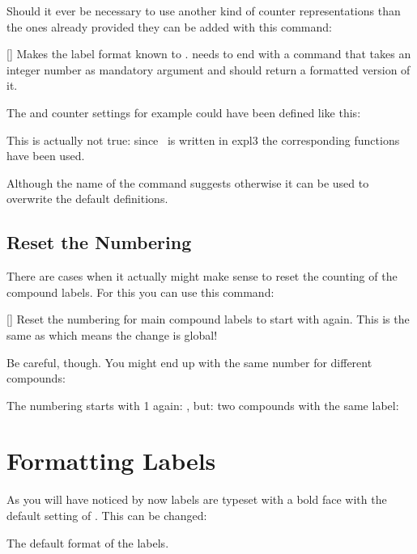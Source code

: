 \documentclass[load-preamble+,babel-options={ngerman,british,american}]{cnltx-doc}
\begin{document}
Should it ever be necessary to use another kind of counter representations
than the ones already provided they can be added with this command:
\begin{commands}
  []
    Makes the label format  known to \chemnum.  
    needs to end with a command that takes an integer number as mandatory
    argument and should return a formatted version of it.
\end{commands}
The  and  counter settings for example could have been
defined like this:
\begin{sourcecode}
    {\@alph}
\end{sourcecode}
This is actually not true: since \chemnum\ is written in expl3 the
corresponding  functions have been used.

Although the name of the command suggests otherwise it can be used to
overwrite the default definitions.

\subsection{Reset the Numbering}\label{sec:reset-numbering}

There are cases when it actually might make sense to reset the counting of the
compound labels.  For this you can use this command:
\begin{commands}
  []
    Reset the numbering for main compound labels to start with 
    again.  This is the same as
     which
    means the change is global!
\end{commands}

Be careful, though.  You might end up with the same number for different
compounds:
\begin{example}
   \resetcmpd The numbering starts with 1 again: , but:
    two compounds with the same label: 
\end{example}

\section{Formatting Labels}\label{sec:formatting-labels}

As you will have noticed by now labels are typeset with a bold face with the
default setting of \chemnum.  This can be changed:
\begin{options}
    The default format of the labels.
\end{options}
\end{document}
